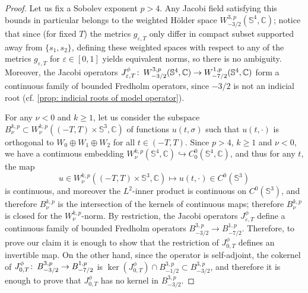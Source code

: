 \documentclass{article}
\numberwithin{equation}{section}        %
\theoremstyle{bfnote}
\theoremstyle{definition}
\theoremstyle{bfremark}
\newcommand{\col}{\colon \thinspace}        %
\newcommand{\C}{\mathbb{C}}                 %
\newcommand{\Sp}{\mathbb{S}}                %
\begin{document}
\begin{proof}
    Let us fix a Sobolev exponent $p > 4$. Any Jacobi field satisfying this bounds in particular belongs to the weighted H\"older space $W^{3,p}_{-3/2}(\mathbb{S}^4,\C)$; notice that since (for fixed $T$) the metrics $g_{\varepsilon,T}$ only differ in compact subset supported away from $\{s_1,s_2\}$, defining these weighted spaces with respect to any of the metrics $g_{\varepsilon,T}$ for $\varepsilon \in [0,1]$ yields equivalent norms, so there is no ambiguity. Moreover, the Jacobi operators $J^\phi_{\varepsilon,T}\col W^{3,p}_{-3/2}(\mathbb{S}^4,\C) \rightarrow W^{1,p}_{-7/2}(\mathbb{S}^4,\C)$ form a continuous family of bounded Fredholm operators, since $-3/2$ is not an indicial root (cf. \cref{prop: indicial roots of model operator}).
    
    For any $\nu < 0$ and $k \geq 1$, let us consider the subspace $B^{k,p}_\nu \subset W^{k,p}_\nu((-T,T) \times \Sp^3,\C)$ of functions $u(t,\sigma)$ such that $u(t,\cdot)$ is orthogonal to $W_0 \oplus W_1 \oplus W_2$ for all $t \in (-T,T)$. Since $p > 4$, $k \geq 1$ and $\nu < 0$, we have a continuous embedding $W^{k,p}_\nu(\Sp^4,\C) \hookrightarrow C^0_0(\Sp^4,\C)$, and thus for any $t$, the map 
    \begin{equation*}
        u \in W^{k,p}_\nu((-T,T) \times \Sp^3,\C) \mapsto u(t,\cdot) \in C^0(\Sp^3) 
    \end{equation*}
    is continuous, and moreover the $L^2$-inner product is continuous on $C^0(\Sp^3)$, and therefore $B^{k,p}_\nu$ is the intersection of the kernels of continuous maps; therefore $B^{k,p}_\nu$ is closed for the $W^{k,p}_\nu$-norm. By restriction, the Jacobi operators $J^\phi_{\varepsilon,T}$ define a continuous family of bounded Fredholm operators $B^{3,p}_{-3/2} \rightarrow B^{1,p}_{-7/2}$. Therefore, to prove our claim it is enough to show that the restriction of $J^\phi_{0,T}$ defines an invertible map. On the other hand, since the operator is self-adjoint, the cokernel of $J^\phi_{0,T} \col B^{3,p}_{-3/2} \rightarrow B^{1,p}_{-7/2}$ is $\ker(J^\phi_{0,T}) \cap B^{3,p}_{-1/2} \subset B^{3,p}_{-3/2}$, and therefore it is enough to prove that $J^\phi_{0,T}$ has no kernel in $B^{3,p}_{-3/2}$.


\end{proof}
\end{document}
